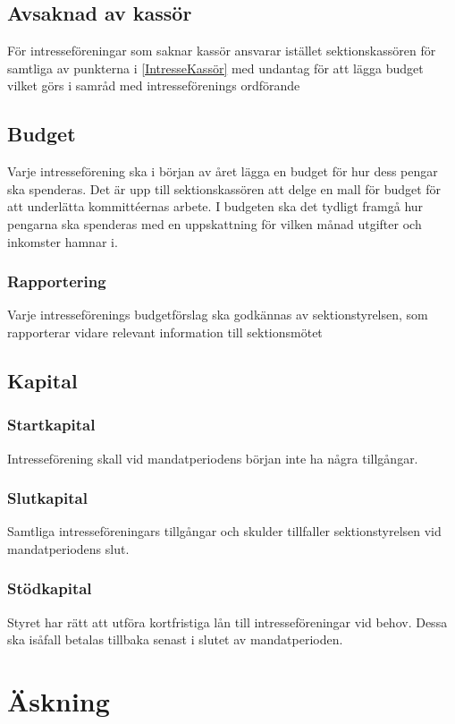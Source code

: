 \documentclass[a4paper]{dtek}
\begin{document}
\subsection{Avsaknad av kassör}
För intresseföreningar som saknar kassör ansvarar istället sektionskassören för samtliga av punkterna i \ref{IntresseKassör} med undantag för att lägga budget vilket görs i samråd med intresseförenings ordförande

\subsection{Budget}\label{IntresseBudget}
Varje intresseförening ska i början av året lägga en budget för hur dess pengar ska spenderas.
Det är upp till sektionskassören att delge en mall för budget för att underlätta kommittéernas arbete.
I budgeten ska det tydligt framgå hur pengarna ska spenderas med en uppskattning för vilken månad utgifter och inkomster hamnar i.

\subsubsection{Rapportering}
Varje intresseförenings budgetförslag ska godkännas av sektionstyrelsen, som rapporterar vidare relevant information till sektionsmötet

\subsection{Kapital}
\subsubsection{Startkapital}
Intresseförening skall vid mandatperiodens början inte ha några tillgångar.
\subsubsection{Slutkapital}
Samtliga intresseföreningars tillgångar och skulder tillfaller sektionstyrelsen vid mandatperiodens slut.
\subsubsection{Stödkapital}
Styret har rätt att utföra kortfristiga lån till intresseföreningar vid behov.
Dessa ska isåfall betalas tillbaka senast i slutet av mandatperioden.

\section{Äskning}
\end{document}

